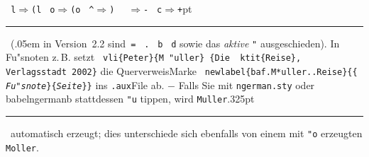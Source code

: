\documentclass[12pt,a4paper]{article}
\newcommand{\pdfko}[1]{\kern #1pt
                              \rule[-0.4ex]{0.8pt}{0ex}\kern -0.8pt
                          \strut\ignorespaces}%
\newcommand{\pbs}{\string\ \unskip}
\newcommand{\bs}{\protect\pbs}
\begin{document}
{\texttt{\bs l}\nobreak\hspace{.25em}$\Rightarrow$\nobreak\hspace{.2em}\texttt{(l}\hspace{.8em}
\texttt{\bs o}\nobreak\hspace{.25em}$\Rightarrow$\nobreak\hspace{.2em}\texttt{(o}\hspace{.8em}
\texttt{\bs \string^}\nobreak\hspace{.25em}$\Rightarrow$\nobreak\hspace{.2em}\texttt{)}\hspace{.8em}
\texttt{\bs \string~}\nobreak\hspace{.25em}$\Rightarrow$\nobreak\hspace{.2em}\texttt{-}\hspace{.65em} 
\texttt{\bs c}\nobreak\hspace{.25em}$\Rightarrow$\nobreak\hspace{.2em}\texttt{+}\pdfko{1}\
\hspace{.8em}(\kern.05em in Version~2.2 
\hspace{.1em}sind\hspace{.7em}\texttt{\bs \string=}\hspace{.5em} \texttt{\bs \string.}
\hspace{.225em}\texttt{\bs b} \hspace{.4em}\texttt{\bs d} \hspace{.4em}sowie das
\hspace{.1em}\textit{aktive} \texttt{\string"} 
\hspace{.15em}ausgeschieden).\hspace{.3em} In Fu"snoten z.\,B. setzt 
\hspace{.3em}\texttt{\bs vli\hspace{.2em}\{Peter\}\hspace{.2em}\{M\bs\string"uller\}\hspace{.2em}%
\{Die \bs ktit\{Reise\}, Verlagsstadt 2002\}}\hspace{.3em} 
die Querverweis\hy Marke 
\hspace{.325em}\texttt{\bs newlabel\{baf.M*uller..Reise\}\{\{{\normalfont 
\textit{Fu"snote}}\}\{{\normalfont \textit{Seite}}\}\}}\hspace{.35em} ins\hspace{-.15em} \texttt{.aux}\hy File ab.
$-$ Falls Sie mit \texttt{ngerman.sty} oder babel\hy ngermanb stattdessen \hspace{-.075em}\texttt{\string"u} tippen, wird 
\texttt{Muller}\pdfko{.325}\ automatisch erzeugt; dies unterschiede sich ebenfalls von einem mit \hspace{-.075em}\texttt{\string"o} erzeugten \texttt{Moller}.}
\end{document}
